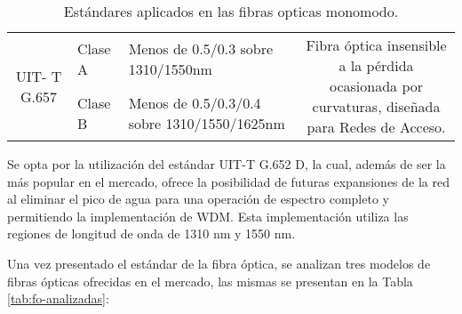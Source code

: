 \begin{table}[H]
\begin{tabular}{|c|p{6.78em}|p{22.945em}|c|}
    \hline
    \multicolumn{1}{|c|}{\multirow{2}[4]{*}{UIT- T G.657}} & Clase A & Menos de 0.5/0.3 sobre 1310/1550nm & \multicolumn{1}{c|}{\multirow{2}[4]{*}{Fibra óptica insensible a la pérdida \newline{} ocasionada por curvaturas, diseñada para Redes de Acceso.}} \bigstrut\\
\cline{2-3}          & Clase B & Menos de 0.5/0.3/0.4 sobre 1310/1550/1625nm &  \bigstrut\\
    \hline
    \end{tabular}%
    \caption{Estándares aplicados en las fibras opticas monomodo.}
  \label{tab:estandares}%
\end{table}%



Se opta por la utilización del estándar UIT-T G.652 D, la cual, además de ser la más popular en el mercado, ofrece la posibilidad de futuras expansiones de la red al eliminar el pico de agua para una operación de espectro completo y permitiendo la implementación de WDM. Esta implementación utiliza las regiones de longitud de onda de 1310 nm y 1550 nm.




 

Una vez presentado el estándar de la fibra óptica, se analizan tres modelos de fibras ópticas ofrecidas en el mercado, las mismas se presentan en la Tabla \ref{tab:fo-analizadas}:



